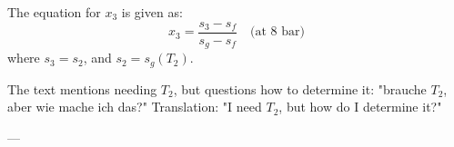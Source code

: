 The equation for \( x_3 \) is given as:  
\[
x_3 = \frac{s_3 - s_f}{s_g - s_f} \quad \text{(at 8 bar)}
\]  
where \( s_3 = s_2 \), and \( s_2 = s_g(T_2) \).  

The text mentions needing \( T_2 \), but questions how to determine it:  
"brauche \( T_2 \), aber wie mache ich das?"  
Translation: "I need \( T_2 \), but how do I determine it?"

---